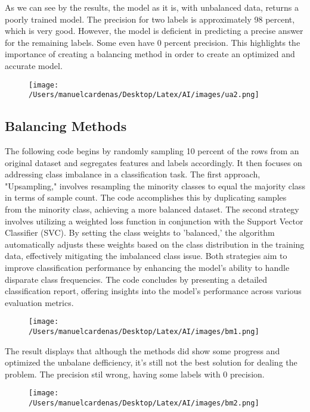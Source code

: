 \documentclass{article}
\begin{document}
    As we can see by the results, the model as it is, with unbalanced data,  returns a poorly trained model. 
    The precision for two labels is approximately 98 percent, which is very good. However, the model is deficient in 
    predicting a precise answer for the remaining labels. Some even have 0 percent precision. This highlights the importance of creating 
    a balancing method in order to create an optimized and accurate model. \pagebreak
    \begin{figure}[h]
        \centering
        \texttt{[image: /Users/manuelcardenas/Desktop/Latex/AI/images/ua2.png]}
        \label{fig:ua2}
    \end{figure}


    \subsection{Balancing Methods}

    The following code begins by randomly sampling 10 percent of the rows from an original dataset and segregates 
    features and labels accordingly. It then focuses on addressing class imbalance in a classification task. The first approach, 
    "Upsampling," involves resampling the minority classes to equal the majority class in terms of sample count. The code accomplishes 
    this by duplicating samples from the minority class, achieving a more balanced dataset. The second strategy involves 
    utilizing a weighted loss function in conjunction with the Support Vector Classifier (SVC). By setting the class weights 
    to 'balanced,' the algorithm automatically adjusts these weights based on the class distribution in the training data, 
    effectively mitigating the imbalanced class issue. Both strategies aim to improve classification performance by enhancing 
    the model's ability to handle disparate class frequencies. The code concludes by presenting a detailed classification report, 
    offering insights into the model's performance across various evaluation metrics.\pagebreak
    \begin{figure}[h]
        \centering
        \texttt{[image: /Users/manuelcardenas/Desktop/Latex/AI/images/bm1.png]}
        \label{fig:bm1}
    \end{figure}

    The result displays that although the methods did show some progress and optimized the unbalane defficiency, 
    it's still not the best solution for dealing the problem. The precision stil wrong, having some labels with 0 precision. \pagebreak
    \begin{figure}[h]
        \centering
        \texttt{[image: /Users/manuelcardenas/Desktop/Latex/AI/images/bm2.png]}
        \label{fig:bm2}
    \end{figure}
\end{document}
